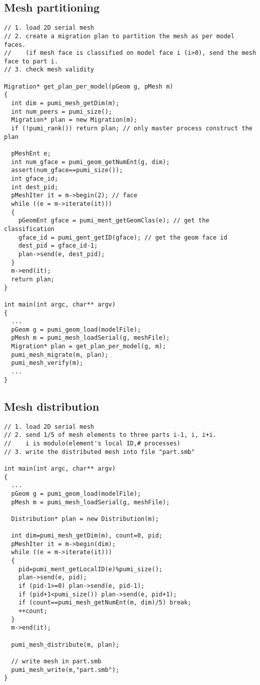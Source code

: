 \subsection{Mesh partitioning}
\begin{small}
\begin{verbatim}
// 1. load 2D serial mesh
// 2. create a migration plan to partition the mesh as per model faces.
//    (if mesh face is classified on model face i (i>0), send the mesh face to part i.
// 3. check mesh validity

Migration* get_plan_per_model(pGeom g, pMesh m)
{
  int dim = pumi_mesh_getDim(m);
  int num_peers = pumi_size();
  Migration* plan = new Migration(m);
  if (!pumi_rank()) return plan; // only master process construct the plan

  pMeshEnt e;
  int num_gface = pumi_geom_getNumEnt(g, dim);
  assert(num_gface==pumi_size());
  int gface_id;
  int dest_pid;
  pMeshIter it = m->begin(2); // face
  while ((e = m->iterate(it))) 
  { 
    pGeomEnt gface = pumi_ment_getGeomClas(e); // get the classification
    gface_id = pumi_gent_getID(gface); // get the geom face id
    dest_pid = gface_id-1;
    plan->send(e, dest_pid);    
  }
  m->end(it);
  return plan;
}

int main(int argc, char** argv)
{
  ...
  pGeom g = pumi_geom_load(modelFile);
  pMesh m = pumi_mesh_loadSerial(g, meshFile);
  Migration* plan = get_plan_per_model(g, m);
  pumi_mesh_migrate(m, plan);
  pumi_mesh_verify(m);
  ...
}
\end{verbatim}
\end{small}

\subsection{Mesh distribution}
\begin{small}
\begin{verbatim}
// 1. load 2D serial mesh
// 2. send 1/5 of mesh elements to three parts i-1, i, i+i.
//    i is modulo(element's local ID,# processes)
// 3. write the distributed mesh into file "part.smb"

int main(int argc, char** argv)
{
  ...
  pGeom g = pumi_geom_load(modelFile);
  pMesh m = pumi_mesh_loadSerial(g, meshFile);

  Distribution* plan = new Distribution(m);

  int dim=pumi_mesh_getDim(m), count=0, pid;
  pMeshIter it = m->begin(dim);
  while ((e = m->iterate(it)))
  {
    pid=pumi_ment_getLocalID(e)%pumi_size();
    plan->send(e, pid);
    if (pid-1>=0) plan->send(e, pid-1);
    if (pid+1<pumi_size()) plan->send(e, pid+1);
    if (count==pumi_mesh_getNumEnt(m, dim)/5) break;
    ++count;
  }
  m->end(it);

  pumi_mesh_distribute(m, plan);

  // write mesh in part.smb
  pumi_mesh_write(m,"part.smb"); 
}
\end{verbatim}
\end{small}

